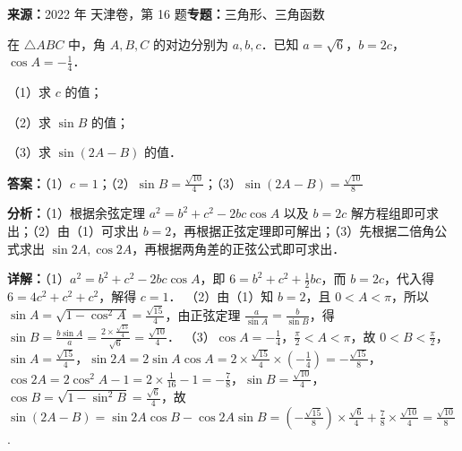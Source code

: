 \begin{question}[points=15]
\textbf{来源：}2022 年 天津卷，第 16 题\quad \textbf{专题：}三角形、三角函数\par
在 $\triangle ABC$ 中，角 $A,B,C$ 的对边分别为 $a,b,c$．已知 $a=\sqrt{6}$，$b=2c$，$\cos A=-\frac{1}{4}$．

（1）求 $c$ 的值；

（2）求 $\sin B$ 的值；

（3）求 $\sin(2A-B)$ 的值．
\begin{solution}
\textbf{答案：}（1）$c=1$；（2）$\sin B=\frac{\sqrt{10}}{4}$；（3）$\sin(2A-B)=\frac{\sqrt{10}}{8}$

\textbf{分析：}（1）根据余弦定理 $a^2=b^2+c^2-2bc\cos A$ 以及 $b=2c$ 解方程组即可求出；（2）由（1）可求出 $b=2$，再根据正弦定理即可解出；（3）先根据二倍角公式求出 $\sin2A,\cos2A$，再根据两角差的正弦公式即可求出．

\textbf{详解：}（1）$a^2=b^2+c^2-2bc\cos A$，即 $6=b^2+c^2+\frac{1}{2}bc$，而 $b=2c$，代入得 $6=4c^2+c^2+c^2$，解得 $c=1$．
（2）由（1）知 $b=2$，且 $0<A<\pi$，所以 $\sin A=\sqrt{1-\cos^2 A}=\frac{\sqrt{15}}{4}$，由正弦定理 $\frac{a}{\sin A}=\frac{b}{\sin B}$，得 $\sin B=\frac{b\sin A}{a}=\frac{2\times\frac{\sqrt{15}}{4}}{\sqrt{6}}=\frac{\sqrt{10}}{4}$．
（3）$\cos A=-\frac{1}{4}$，$\frac{\pi}{2}<A<\pi$，故 $0<B<\frac{\pi}{2}$，$\sin A=\frac{\sqrt{15}}{4}$，$\sin2A=2\sin A\cos A=2\times\frac{\sqrt{15}}{4}\times(-\frac{1}{4})=-\frac{\sqrt{15}}{8}$，$\cos2A=2\cos^2A-1=2\times\frac{1}{16}-1=-\frac{7}{8}$，$\sin B=\frac{\sqrt{10}}{4}$，$\cos B=\sqrt{1-\sin^2B}=\frac{\sqrt{6}}{4}$，故 $\sin(2A-B)=\sin2A\cos B-\cos2A\sin B=(-\frac{\sqrt{15}}{8})\times\frac{\sqrt{6}}{4}+\frac{7}{8}\times\frac{\sqrt{10}}{4}=\frac{\sqrt{10}}{8}$.
\end{solution}
\end{question}

